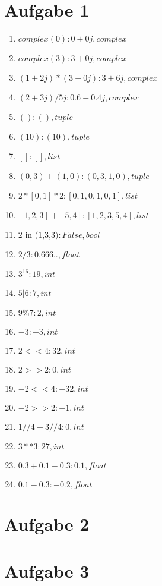 
\newcommand{\dozent}{Prof. Dr. Claudia Müller-Birn, Barry Linnert}					%
\newcommand{\tutor}{Thierry Meurers}						%
\newcommand{\tutoriumNo}{10}				%
\newcommand{\ubungNo}{02}									%
\newcommand{\veranstaltung}{Objektorientierte Programmierung}	%
\newcommand{\semester}{SoSe 17}						%
\newcommand{\studenten}{Stefaan Hessmann, Jaap Pedersen, Mark Niehues}			%




\section{Aufgabe 1}

\begin{enumerate}
\item $complex(0): 0+0j, complex$
\item $complex(3): 3+0j, complex$
\item $(1+2j)*(3+0j): 3+6j, complex$
\item $(2+3j)/5j: 0.6-0.4j, complex$
\item $(): (), tuple$
\item $(10): (10), tuple$
\item $[]: [], list$
\item $(0,3)+(1,0): (0,3,1,0), tuple$
\item $2*[0,1]*2: [0,1,0,1,0,1], list$
\item $[1,2,3]+[5,4]: [1,2,3,5,4], list$
\item $\text{2 in (1,3,3)}: False, bool$
\item $2/3: 0.666.., float$
\item $3^16: 19, int$
\item $5|6: 7, int$
\item $9\%7: 2, int$
\item $-3: -3, int$
\item $2<<4: 32, int$
\item $2>>2: 0, int$
\item $-2<<4: -32, int$
\item $-2>>2: -1, int$
\item $1//4+3//4: 0, int$
\item $3**3: 27, int$
\item $0.3+0.1-0.3: 0.1, float$
\item $0.1-0.3: -0.2, float$
\end{enumerate}
\section{Aufgabe 2}

\section{Aufgabe 3}



